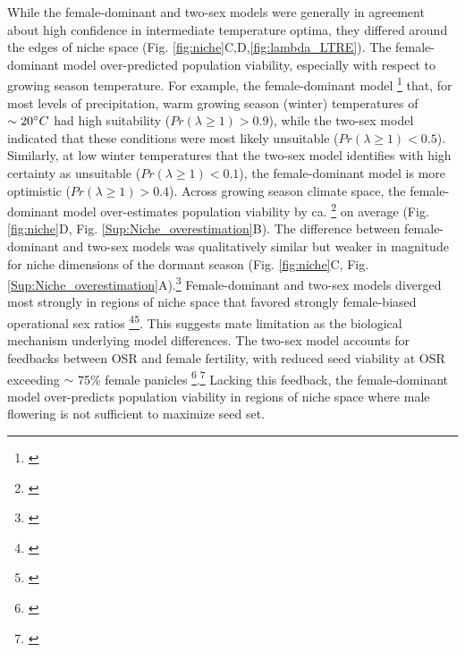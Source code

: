 \documentclass[12pt]{article}\usepackage[]{graphicx}\usepackage[dvipsnames]{xcolor}
\newcommand{\tom}[2]{{\color{red}{#1}}\footnote{\textit{\color{red}{#2}}}}
\newcommand{\jacob}[2]{{\color{blue}{#1}}\footnote{\textit{\color{blue}{#2}}}}
\begin{document}
While the female-dominant and two-sex models were generally in agreement about high confidence in intermediate temperature optima, they differed around the edges of niche space (Fig. \ref{fig:niche}C,D,\ref{fig:lambda_LTRE}). 
The female-dominant model over-predicted population viability, especially with respect to growing season temperature. 
For example, the female-dominant model \tom{predicted}{I think I am switching tenses. We will need to clean this up.} that, for most levels of precipitation, warm growing season (winter) temperatures of $\sim 20\degree C$ had high suitability ($Pr(\lambda \ge 1) > 0.9$), while the two-sex model indicated that these conditions were most likely unsuitable ($Pr(\lambda \ge 1) < 0.5$). 
Similarly, at low winter temperatures that the two-sex model identifies with high certainty as unsuitable ($Pr(\lambda \ge 1) < 0.1$), the female-dominant model is more optimistic ($Pr(\lambda \ge 1) > 0.4$). 
Across growing season climate space, the female-dominant model over-estimates population viability by ca. \tom{10\%,}{I would check what this difference actually is. The number 10 came from me guessing.} on average (Fig. \ref{fig:niche}D, Fig. \ref{Sup:Niche_overestimation}B). 
The difference between female-dominant and two-sex models was qualitatively similar but weaker in magnitude for niche dimensions of the dormant season (Fig. \ref{fig:niche}C, Fig. \ref{Sup:Niche_overestimation}A).\tom{}{The niche histogram figure is duplicated in the supplement. Also, can you add a legend to this figure?} 
Female-dominant and two-sex models diverged most strongly in regions of niche space that favored strongly female-biased operational sex ratios \jacob{(Figure \ref{Sup:OSR})}{This  Figure is new and I am not sure if we should keep it in the manuscript}\tom{}{I like it! But is the scale correct on panel A?}. 
This suggests mate limitation as the biological mechanism underlying model differences. 
The two-sex model accounts for feedbacks between OSR and female fertility, with reduced seed viability at OSR exceeding $\sim$ 75\% female panicles \jacob{(Fig. WE NEED A FIGURE FOR THIS)}{I don't understand  the type of Figure you are asking here}.\tom{}{I am talking about a figure showing how seed viability declines with increasing female bias in the OSR. This could go in th section of the supplement where you describe that experiment and analysis.}
Lacking this feedback, the female-dominant model over-predicts population viability in regions of niche space where male flowering is not sufficient to maximize seed set. 
\end{document}
